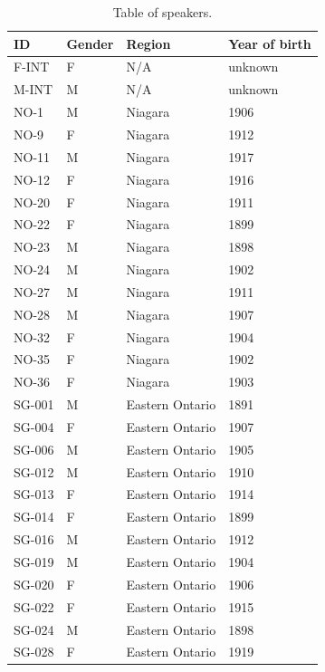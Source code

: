 \documentclass[11pt]{article}
\begin{document}
\begin{table}[ht!]
    \centering
    \begin{tabular}{llll}
        \toprule
        ID & Gender & Region  & Year of birth \\
        \midrule
        F-INT  & F & N/A             & unknown \\
        M-INT  & M & N/A             & unknown \\
        NO-1   & M & Niagara         & 1906    \\
        NO-9   & F & Niagara         & 1912    \\
        NO-11  & M & Niagara         & 1917    \\
        NO-12  & F & Niagara         & 1916    \\
        NO-20  & F & Niagara         & 1911    \\
        NO-22  & F & Niagara         & 1899    \\
        NO-23  & M & Niagara         & 1898    \\
        NO-24  & M & Niagara         & 1902    \\
        NO-27  & M & Niagara         & 1911    \\
        NO-28  & M & Niagara         & 1907    \\
        NO-32  & F & Niagara         & 1904    \\
        NO-35  & F & Niagara         & 1902    \\
        NO-36  & F & Niagara         & 1903    \\
        SG-001 & M & Eastern Ontario & 1891    \\
        SG-004 & F & Eastern Ontario & 1907    \\
        SG-006 & M & Eastern Ontario & 1905    \\
        SG-012 & M & Eastern Ontario & 1910    \\
        SG-013 & F & Eastern Ontario & 1914    \\
        SG-014 & F & Eastern Ontario & 1899    \\
        SG-016 & M & Eastern Ontario & 1912    \\
        SG-019 & M & Eastern Ontario & 1904    \\
        SG-020 & F & Eastern Ontario & 1906    \\
        SG-022 & F & Eastern Ontario & 1915    \\
        SG-024 & M & Eastern Ontario & 1898    \\
        SG-028 & F & Eastern Ontario & 1919    \\
        \bottomrule
    \end{tabular}
    \caption{Table of speakers.}\label{tab:speakers}
\end{table}
\end{document}
